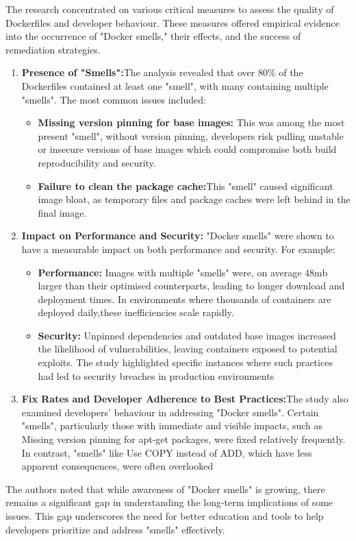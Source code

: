 The research concentrated on various critical measures to assess the quality of Dockerfiles and developer behaviour. These measures offered empirical evidence into the occurrence of "Docker smells," their effects, and the success of remediation strategies.
\begin{enumerate}
    \item \textbf{Presence of "Smells":}The analysis revealed that over 80\% of the Dockerfiles contained at least one "smell", with many containing multiple "smells". The most common issues included:
    \begin{itemize}
        \item \textbf{Missing version pinning for base images:} This was among the most present "smell", without version pinning, developers risk pulling unstable or insecure versions of base images which could compromise both build reproducibility and security. 
        \item \textbf{Failure to clean the package cache:}This "smell" caused significant image bloat, as temporary files and package caches were left behind in the final image. 
        \end{itemize}
        \item \textbf{Impact on Performance and Security:} "Docker smells" were shown to have a measurable impact on both performance and security. For example:
        \begin{itemize}
            \item \textbf{Performance:} Images with multiple "smells" were, on average 48mb larger than their optimised counterparts, leading to longer download and deployment times. In environments where thousands of containers are deployed daily,these inefficiencies scale rapidly. 
            \item \textbf{Security:} Unpinned dependencies and outdated base images increased the likelihood of vulnerabilities, leaving containers exposed to potential exploits. The study highlighted specific instances where such practices had led to security breaches in production environments
        \end{itemize}
        \item \textbf{Fix Rates and Developer Adherence to Best Practices:}The study also examined developers' behaviour in addressing "Docker smells". Certain "smells", particularly those with immediate and visible impacts, such as Missing version pinning for apt-get packages, were fixed relatively frequently. In contrast, "smells" like Use COPY instead of ADD, which have less apparent consequences, were often overlooked
        \end{enumerate}
The authors noted that while awareness of "Docker smells" is growing, there remains a significant gap in understanding the long-term implications of some issues. This gap underscores the need for better education and tools to help developers prioritize and address "smells" effectively.\cite{DockerArtifacts}


